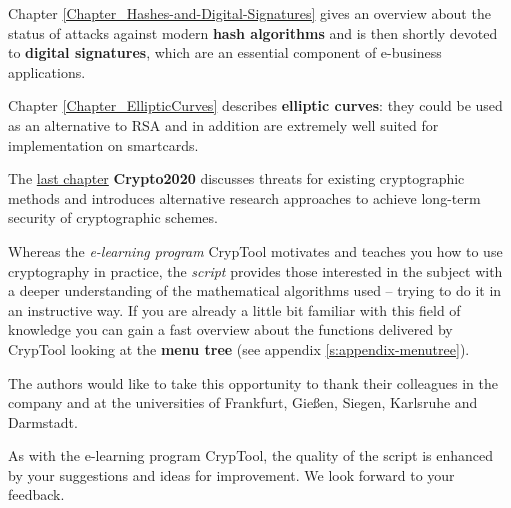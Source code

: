 Chapter \ref{Chapter_Hashes-and-Digital-Signatures} gives
an overview about the status of attacks against modern {\bf hash algorithms}
and is then shortly devoted to {\bf digital signatures}, 
which are an essential component of e-business applications.

Chapter \ref{Chapter_EllipticCurves} describes {\bf elliptic curves}:
they could be used as an alternative to RSA and in addition are extremely
well suited for implementation on smartcards.

The \hyperlink{Chapter_Crypto2020}{last chapter} {\bf Crypto2020}
discusses threats for existing cryptographic methods and introduces
alternative research approaches to achieve long-term security
of cryptographic schemes.

Whereas the \textit{e-learning program} CrypTool motivates and
teaches you how to use cryptography in practice, the \textit{script} provides
those interested in the subject with a deeper understanding of the mathematical
algorithms used -- trying to do it in an instructive way.
If you are already a little bit familiar with this field of knowledge you can
gain a fast overview about the functions delivered by CrypTool looking at the
{\bf menu tree} (see appendix \ref{s:appendix-menutree}).

The authors would like to take this opportunity to thank their colleagues 
in the company and at the universities of Frankfurt, Gie\ss en, 
Siegen, Karlsruhe and Darmstadt.

\enlargethispage{12pt}
As with the e-learning program CrypTool, the quality of the 
script is enhanced by your suggestions and ideas for improvement. 
We look forward to your feedback.


